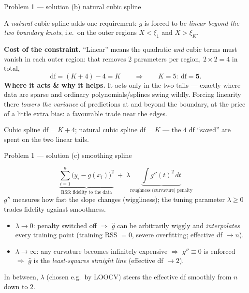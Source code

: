 \documentclass[aspectratio=169,11pt]{beamer}
\begin{document}
\begin{frame}{Problem 1 --- solution (b) natural cubic spline}
  \begin{solutionbox}
    A \emph{natural} cubic spline adds one requirement: $g$ is forced to be \emph{linear beyond
    the two boundary knots}, i.e.\ on the outer regions $X<\xi_1$ and $X>\xi_K$.
    \medskip

    \textbf{Cost of the constraint.} ``Linear'' means the quadratic \emph{and} cubic terms must
    vanish in each outer region: that removes $2$ parameters per region, $2\times 2=4$ in total,
    \[
      \mathrm{df}=(K+4)-4=\boxed{K}\qquad\Rightarrow\qquad K=5:\ \mathrm{df}=\mathbf{5}.
    \]
    \textbf{Where it acts \& why it helps.} It acts only in the two tails --- exactly where data
    are sparse and ordinary polynomials/splines swing wildly. Forcing linearity there
    \emph{lowers the variance} of predictions at and beyond the boundary, at the price of a
    little extra bias: a favourable trade near the edges.
    \begin{takeaway}
      Cubic spline $\mathrm{df}=K+4$; natural cubic spline $\mathrm{df}=K$ --- the $4$ df
      ``saved'' are spent on the two linear tails.
    \end{takeaway}
  \end{solutionbox}
\end{frame}

\begin{frame}{Problem 1 --- solution (c) smoothing spline}
  \begin{solutionbox}
    \[
      \underbrace{\sum_{i=1}^{n}\bigl(y_i-g(x_i)\bigr)^2}_{\text{RSS: fidelity to the data}}
      \;+\;\lambda\underbrace{\int g''(t)^2\,dt}_{\text{roughness (curvature) penalty}}
    \]
    $g''$ measures how fast the slope changes (wiggliness); the tuning parameter $\lambda\ge 0$
    trades fidelity against smoothness.
    \medskip
    \begin{itemize}
      \item $\lambda\to 0$: penalty switched off $\Rightarrow$ $\hat g$ can be arbitrarily wiggly
        and \emph{interpolates} every training point (training RSS $=0$, severe overfitting;
        effective df $\to n$).
      \item $\lambda\to\infty$: any curvature becomes infinitely expensive $\Rightarrow$
        $g''\equiv 0$ is enforced $\Rightarrow$ $\hat g$ is the \emph{least-squares straight line}
        (effective df $\to 2$).
    \end{itemize}
    In between, $\lambda$ (chosen e.g.\ by LOOCV) steers the effective df smoothly from $n$ down
    to $2$.
  \end{solutionbox}
\end{frame}
\end{document}
